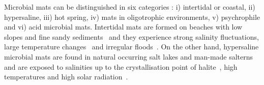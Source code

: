    Microbial mats can be distinguished in six categories 
   \citep{bolhuis_molecular_2014, prieto-barajas_microbial_2018}: 
   i) intertidal or coastal, 
   ii) hypersaline, 
   iii) hot spring, 
   iv) mats in oligotrophic environments, 
   v) psychrophile and vi) acid microbial mats. 
   Intertidal mats are formed on beaches with low slopes and fine sandy sediments~\citep{stal_cyanobacterial_2012} 
   and they experience strong salinity fluctuations, large temperature changes~\citep{bolhuis_molecular_2014}
   and irregular floods~\citep{prieto-barajas_microbial_2018}. 
   On the other hand, hypersaline microbial mats are found in natural occurring salt lakes and man-made salterns~\citep{bolhuis_molecular_2014} and are exposed to salinities up to 
   the crystallisation point of halite~\citep{jorgensen_diffusion_1994}, 
   high temperatures and high solar radiation~\citep{bolhuis_molecular_2014}. 
   
